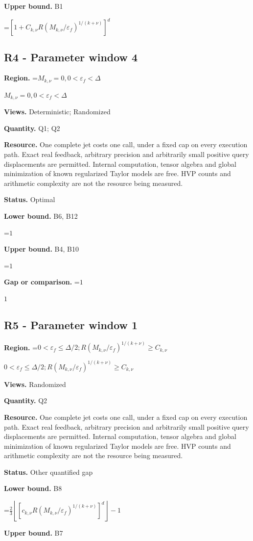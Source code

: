 \documentclass[10pt,a4paper]{article}
\newcommand{\AtlasMath}[1]{\par\begingroup\centering\setbox0=\hbox{$\displaystyle #1$}\ifdim\wd0>1.4\linewidth\typeout{ATLAS WIDE FORMULA: \the\wd0}\fi\ifdim\wd0>\linewidth\resizebox{\linewidth}{!}{\box0}\else\box0\fi\par\endgroup}
\newcommand{\AtlasInlineMath}[1]{\begingroup\setbox0=\hbox{$#1$}\ifdim\wd0>.4\linewidth\endgroup\AtlasMath{#1}\else\endgroup$#1$\fi}
\begin{document}
\textbf{Upper bound.} B1

\AtlasMath{[1+C_{k,\nu}R(M_{k,\nu}/\varepsilon_f)^{1/(k+\nu)}]^d}
\subsection{R4 - Parameter window 4}
\textbf{Region.} \AtlasInlineMath{M_{k,\nu}=0,0<\varepsilon_f<\Delta}

\textbf{Views.} Deterministic; Randomized

\textbf{Quantity.} Q1; Q2

\textbf{Resource.} One complete jet costs one call, under a fixed cap on every execution path. Exact real feedback, arbitrary precision and arbitrarily small positive query displacements are permitted. Internal computation, tensor algebra and global minimization of known regularized Taylor models are free. HVP counts and arithmetic complexity are not the resource being measured.

\textbf{Status.} Optimal

\textbf{Lower bound.} B6, B12

\AtlasMath{1}
\textbf{Upper bound.} B4, B10

\AtlasMath{1}
\textbf{Gap or comparison.} \AtlasInlineMath{1}

\subsection{R5 - Parameter window 1}
\textbf{Region.} \AtlasInlineMath{0<\varepsilon_f\le \Delta/2;R(M_{k,\nu}/\varepsilon_f)^{1/(k+\nu)}\ge C_{k,\nu}}

\textbf{Views.} Randomized

\textbf{Quantity.} Q2

\textbf{Resource.} One complete jet costs one call, under a fixed cap on every execution path. Exact real feedback, arbitrary precision and arbitrarily small positive query displacements are permitted. Internal computation, tensor algebra and global minimization of known regularized Taylor models are free. HVP counts and arithmetic complexity are not the resource being measured.

\textbf{Status.} Other quantified gap

\textbf{Lower bound.} B8

\AtlasMath{\frac23\left\lfloor[c_{k,\nu}R(M_{k,\nu}/\varepsilon_f)^{1/(k+\nu)}]^d\right\rfloor-1}
\textbf{Upper bound.} B7
\end{document}
